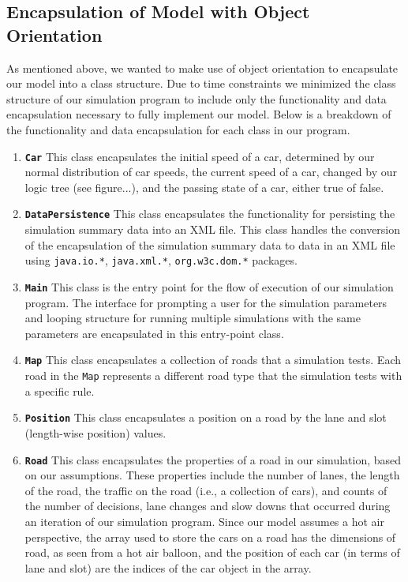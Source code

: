 \documentclass[letterpaper,12pt]{article}
\begin{document}
		\subsection{Encapsulation of Model with Object Orientation}
		As mentioned above, we wanted to make use of object orientation to encapsulate our model into a class structure. Due to time constraints we minimized the class structure of our simulation program to include only the functionality and data encapsulation necessary to fully implement our model. Below is a breakdown of the functionality and data encapsulation for each class in our program.
		\begin{enumerate}
			\item{\textbf{\texttt{Car}}
				This class encapsulates the initial speed of a car, determined by our normal distribution of car speeds, the current speed of a car, changed by our logic tree (see figure...), and the passing state of a car, either true of false. 
			}
			\item{\textbf{\texttt{DataPersistence}}
				This class encapsulates the functionality for persisting the simulation summary data into an XML file. This class handles the conversion of the encapsulation of the simulation summary data to data in an XML file using \texttt{java.io.*}, \texttt{java.xml.*}, \texttt{org.w3c.dom.*} packages.
			}
			\item{\textbf{\texttt{Main}}
				This class is the entry point for the flow of execution of our simulation program. The interface for prompting a user for the simulation parameters and looping structure for running multiple simulations with the same parameters are encapsulated in this entry-point class.
			}
			\item{\textbf{\texttt{Map}}
				This class encapsulates a collection of roads that a simulation tests. Each road in the \texttt{Map} represents a different road type that the simulation tests with a specific rule.
			}
			\item{\textbf{\texttt{Position}}
				This class encapsulates a position on a road by the lane and slot (length-wise position) values.
			}
			\item{\textbf{\texttt{Road}}
				This class encapsulates the properties of a road in our simulation, based on our assumptions. These properties include the number of lanes, the length of the road, the traffic on the road (i.e., a collection of cars), and counts of the number of decisions, lane changes and slow downs that occurred during an iteration of our simulation program. Since our model assumes a hot air perspective, the array used to store the cars on a road has the dimensions of road, as seen from a hot air balloon, and the position of each car (in terms of lane and slot) are the indices of the car object in the array.
}
\end{enumerate}
\end{document}
